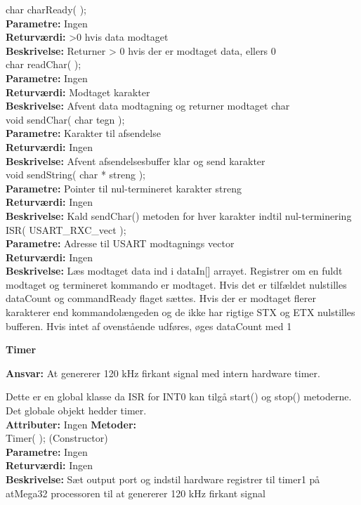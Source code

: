 char charReady( ); \\
\textbf{Parametre:} Ingen \\
\textbf{Returværdi:} >0 hvis data modtaget \\
\textbf{Beskrivelse:} Returner > 0 hvis der er modtaget data, ellers 0 \\

char readChar( ); \\
\textbf{Parametre:} Ingen \\
\textbf{Returværdi:} Modtaget karakter \\
\textbf{Beskrivelse:} Afvent data modtagning og returner modtaget char \\

void sendChar( char tegn ); \\
\textbf{Parametre:} Karakter til afsendelse \\
\textbf{Returværdi:} Ingen \\
\textbf{Beskrivelse:} Afvent afsendelsesbuffer klar og send karakter \\

void sendString( char * streng ); \\
\textbf{Parametre:} Pointer til nul-termineret karakter streng \\
\textbf{Returværdi:} Ingen \\
\textbf{Beskrivelse:} Kald sendChar() metoden for hver karakter indtil nul-terminering \\

ISR( USART\_RXC\_vect ); \\
\textbf{Parametre:} Adresse til USART modtagnings vector \\
\textbf{Returværdi:} Ingen \\
\textbf{Beskrivelse:} Læs modtaget data ind i dataIn[] arrayet. Registrer om en fuldt modtaget og termineret kommando er modtaget. Hvis det er tilfældet nulstilles dataCount og commandReady flaget sættes. Hvis der er modtaget flerer karakterer end kommandolængeden og de ikke har rigtige STX og ETX nulstilles bufferen. Hvis intet af ovenstående udføres, øges dataCount med 1\\

%
%
{\centering
\textbf{Timer}\par
}
\textbf{Ansvar:} At genererer 120 kHz firkant signal med intern hardware timer.

Dette er en global klasse da ISR for INT0 kan tilgå start() og stop() metoderne. Det globale objekt hedder timer. \\
\textbf{Attributer:} Ingen
\textbf{Metoder:} \\
Timer( ); (Constructor) \\
\textbf{Parametre:} Ingen \\
\textbf{Returværdi:} Ingen \\
\textbf{Beskrivelse:} Sæt output port og indstil hardware registrer til timer1 på atMega32 processoren til at genererer 120 kHz firkant signal \\

